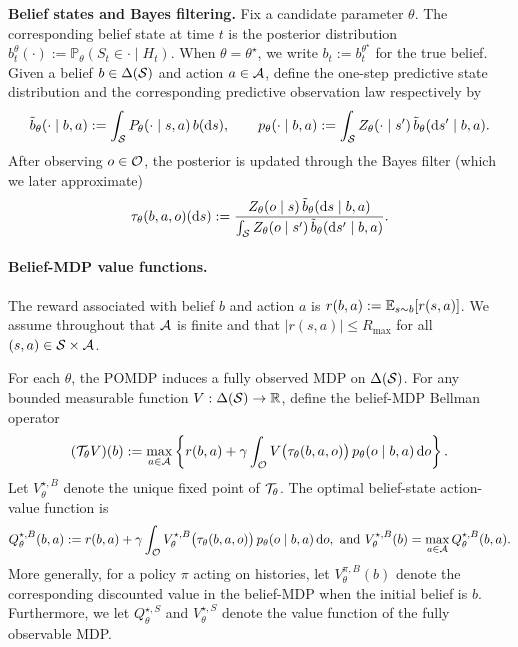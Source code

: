 \textbf{Belief states and Bayes filtering.} Fix a candidate parameter $\theta$. The corresponding belief state at time $t$ is the posterior distribution $b_t^\theta(\cdot) := \mathbb P_{\theta}(S_t\in\cdot \mid H_t)$. When $\theta=\theta^\star$, we write $b_t := b_t^{\theta^\star}$ for the true belief. Given a belief $b\in\Delta({\mathcal{S}})$ and action $a\in{\mathcal{A}}$, define the one-step predictive state distribution and the corresponding predictive observation law respectively by
\begin{equation}\label{eq:predictive_belief}
\tilde b_{\theta}(\cdot \mid b,a)
:= \int_{{\mathcal{S}}} P_{\theta}(\cdot \mid s,a)\, b(\mathrm ds),  \qquad p_{\theta}(\cdot \mid b,a)
:= \int_{{\mathcal{S}}} Z_{\theta}(\cdot \mid s')\, \tilde b_{\theta}(\mathrm ds' \mid b,a).
\end{equation}
After observing $o\in{\mathcal{O}}$, the posterior is updated through the Bayes filter (which we later approximate)
\begin{equation}\label{eq:bayes_update}
\tau_{\theta}(b,a,o)(\mathrm ds) := \frac{Z_{\theta}(o \mid s)\, \tilde b_{\theta}(\mathrm ds \mid b,a)} {\int_{{\mathcal{S}}} Z_{\theta}(o \mid s')\, \tilde b_{\theta}(\mathrm ds' \mid b,a)}.
\end{equation}

\paragraph{Belief-MDP value functions.}
The reward associated with belief $b$ and action $a$ is $r(b,a) := \mathbb{E}_{s \sim b}[r(s,a)]$. We assume throughout that ${\mathcal{A}}$ is finite and that $|r(s,a)|\le R_{\max}$ for all $(s,a)\in{\mathcal{S}}\times{\mathcal{A}}$.

For each $\theta$, the POMDP induces a fully observed MDP on $\Delta({\mathcal{S}})$. For any bounded measurable function $V:\Delta({\mathcal{S}})\to\mathbb R$, define the belief-MDP Bellman operator
\begin{equation}\label{eq:bellman_operator}
({\mathcal{T}}_{\theta}V)(b)
:=
\max_{a\in{\mathcal{A}}}
\left\{
r(b,a)+\gamma \int_{{\mathcal{O}}} V\big(\tau_{\theta}(b,a,o)\big)\, p_{\theta}(o \mid b,a)\, \mathrm do
\right\}.
\end{equation}
Let $V_{\theta}^{\star,B}$ denote the unique fixed point of ${\mathcal{T}}_{\theta}$. The optimal belief-state action-value function is
\begin{equation}\label{eq:Qstar_belief}
Q_{\theta}^{\star,B}(b,a)
:=
r(b,a)+\gamma \int_{{\mathcal{O}}} V_{\theta}^{\star,B}\big(\tau_{\theta}(b,a,o)\big)\, p_{\theta}(o \mid b,a)\, \mathrm do,
\text{ and }
V_{\theta}^{\star,B}(b)=\max_{a\in{\mathcal{A}}}Q_{\theta}^{\star,B}(b,a).
\end{equation}
More generally, for a policy $\pi$ acting on histories, let $V_{\theta}^{\pi,B}(b)$ denote the corresponding discounted value in the belief-MDP when the initial belief is $b$. Furthermore, we let $Q^{\star, S}_{\theta}$ and $V^{\star, S}_{\theta}$ denote the value function of the fully observable MDP.

